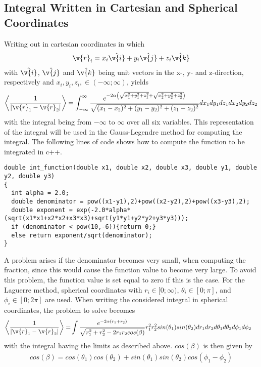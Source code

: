 \subsection{Integral Written in Cartesian and Spherical Coordinates}
\label{subsec:CartesianSpherical}
Writing out  in cartesian coordinates in which
\begin{align}
	\v{r}_i = x_i \hat{\v{i}} + y_i \hat{\v{j}} + z_i \hat{\v{k}}
	\label{eq:CartesianSpherical1}
\end{align}
with $\hat{\v{i}}$, $\hat{\v{j}}$ and $\hat{\v{k}}$ being unit vectors in the x-, y- and z-direction, respectively and $x_i, y_i, z_i, \in (-\infty ; \infty )$, yields
\begin{align}
	\left< \frac{1}{| \v{r}_1 - \v{r}_2 |} \right> 
   = \int _{-\infty } ^{\infty }   
   \frac{e^{-2\alpha \left( \sqrt{x_1^2+y_1^2+z_1^2} + \sqrt{x_2^2+y_2^2+z_2^2}\right) }}{\sqrt{(x_1-x_2)^2+(y_1-y_2)^2+(z_1-z_2)^2}} d x_1 d y_1 d z_1 d x_2 d y_2 d z_2
   \label{eq:CartesianSpherical2}
\end{align}
with the integral being from $-\infty$ to $\infty$ over all six variables.
This representation of the integral will be used in the Gauss-Legendre method for computing the integral.
The following lines of code shows how to compute the function to be integrated in c++.
\begin{lstlisting}
double int_function(double x1, double x2, double x3, double y1, double y2, double y3)
{
  int alpha = 2.0;
  double denominator = pow((x1-y1),2)+pow((x2-y2),2)+pow((x3-y3),2);
  double exponent = exp(-2.0*alpha*(sqrt(x1*x1+x2*x2+x3*x3)+sqrt(y1*y1+y2*y2+y3*y3)));
  if (denominator < pow(10,-6)){return 0;}
  else return exponent/sqrt(denominator);
}
\end{lstlisting}
A problem arises if the denominator becomes very small, when computing the fraction, since this would cause the function value to become very large. 
To avoid this problem, the function value is set equal to zero if this is the case. 
For the Laguerre method, spherical coordinates with 
$r_i \in [0;\infty )$, 
$\theta_i \in [0;\pi]$, and 
$\phi_i \in [0;2\pi]$ are used.
When writing the considered integral in spherical coordinates, the problem to solve becomes 
\begin{align}
	\left< \frac{1}{| \v{r}_1 - \v{r}_2 |} \right> 
   = &\int  
   \frac{e^{-2\alpha (r_1 + r_2 )}}{\sqrt{r_1^2 + r_2 ^2 -2 r_1 r_2 cos(\beta)}}  
r_1 ^2 r_2 ^2 sin(\theta_1 ) sin(\theta_2 ) 
	dr_1 dr_2 d\theta_1 d\theta_2 d\phi_1 d\phi_2    
   \label{eq:CartesianSpherical3}
\end{align}
with the integral having the limits as described above.
$cos(\beta )$ is then given by
\begin{align}
	cos(\beta) = cos(\theta_1) cos(\theta_2) + sin(\theta_1) sin(\theta_2 ) cos(\phi_1 - \phi_2 )
	\label{eq:CartesianSpherical4}
\end{align}